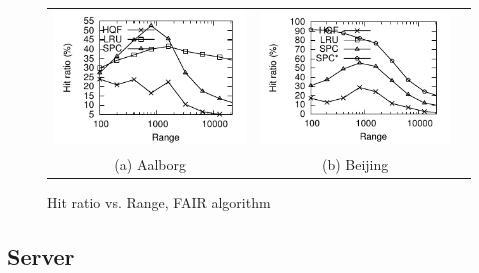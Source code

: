 \begin{figure}[htb]
\center
  \begin{tabular}{ccc}
     \includegraphics[width=0.5\columnwidth]{figures/range_hitratio_rangefair_aal.pdf}
     &
     \includegraphics[width=0.5\columnwidth]{figures/range_hitratio_rangefair_bei.pdf}
      \\
     (a) Aalborg & (b)  Beijing
     \end{tabular}
\caption{Hit ratio vs. Range, FAIR algorithm}
\label{fig:rangeVsHitRatio}
\end{figure}


\subsection{Server}\label{subsec:expServer}


















